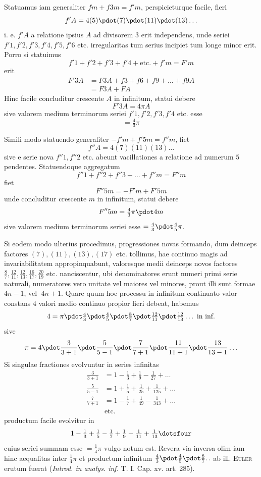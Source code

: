 Statuamus iam generaliter $fm+f3m=f'm$, perspicieturque facile, fieri
\[
f'A=4(5)\pdot(7)\pdot(11)\pdot(13)\ldots
\]
i. e. $f'A$ a relatione ipsius $A$ ad divisorem $3$ erit independens, unde seriei $f'1,f'2,f'3,f'4,f'5,f'6$ etc. irregularitas tum serius incipiet tum longe minor erit. Porro si statuimus
\[
f'1+f'2+f'3+f'4+\text{etc.}+f'm=F'm
\]
erit
\[
\begin{aligned}
F'3A&=F3A+f3+f6+f9+\ldots+f9A\\
&=F3A+FA
\end{aligned}
\]
Hinc facile concluditur crescente $A$ in infinitum, statui debere
\[
F'3A=4\pi A
\]
sive valorem medium terminorum seriei $f'1,f'2,f'3,f'4$ etc. esse
\[
=\tfrac43\pi
\]

Simili modo statuendo generaliter $-f'm+f'5m=f''m$, fiet
\[
f''A=4(7)(11)(13)\ldots
\]
sive e serie nova $f''1,f''2$ etc. abeunt vacillationes a relatione ad numerum $5$ pendentes. Statuendoque aggregatum
\[
f''1+f''2+f''3+\ldots+f''m=F''m
\]
fiet
\[
F''5m=-F'm+F'5m
\]
unde concluditur crescente $m$ in infinitum, statui debere
\[
F''5m=\tfrac43\pi\pdot4m
\]
sive valorem medium terminorum seriei esse $=\tfrac43\pdot\tfrac45\pi$.

Si eodem modo ulterius procedimus, progressiones novas formando, dum deinceps factores $(7),(11),(13),(17)$ etc. tollimus, hae continuo magis ad invariabilitatem appropinquabunt, valoresque medii deinceps novos factores $\tfrac87,\tfrac{12}{11},\tfrac{12}{13},\tfrac{16}{17},\tfrac{20}{19}$ etc. nanciscentur, ubi denominatores erunt numeri primi serie naturali, numeratores vero unitate vel maiores vel minores, prout illi sunt formae $4n-1$, vel ${}^{.}4n+1$. Quare quum hoc processu in infinitum continuato valor 
constans $4$ valori medio continuo propior fieri debeat, habemus
\[
4=\pi\pdot\tfrac43\pdot\tfrac45\pdot\tfrac87\pdot\tfrac{12}{11}\pdot\tfrac{12}{13}\ldots\text{ in inf.}
\]
sive
\[
\pi=4\pdot\frac3{3+1}\pdot\frac5{5-1}\pdot\frac7{7+1}\pdot\frac{11}{11+1}\pdot\frac{13}{13-1}\ldots
\]
Si singulae fractiones evolvuntur in series infinitas
\[
\begin{aligned}
\frac3{3+1}&=1-\frac13+\frac19-\frac1{27}+\ldots\\
\frac5{5-1}&=1+\frac15+\frac1{25}+\frac1{125}+\ldots\\
\frac7{7+1}&=1-\frac17+\frac1{49}-\frac1{343}+\ldots\\
&\text{etc.}
\end{aligned}
\]
productum facile evolvitur in
\[
1-\tfrac13+\tfrac15-\tfrac17+\tfrac19-\tfrac1{11}+\tfrac1{13}\dotsfour
\]
cuius seriei summam esse $=\tfrac14\pi$ vulgo notum est. Revera via inversa olim iam hinc aequalitas inter $\tfrac14\pi$ et productum infinitum $\tfrac43\pdot\tfrac45\pdot\tfrac87\ldotp\ldotp$ ab ill. \textsc{Euler} erutum fuerat (\emph{Introd. in analys. inf.} T. I. Cap. xv. art. 285).


